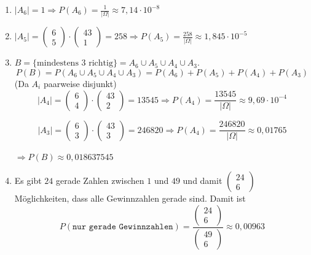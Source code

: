 \documentclass[a4paper,13pt]{scrartcl}
\begin{document}
\begin{enumerate}[label=(\alph*)]
\item $ | A_6 |  = 1 \Rightarrow P(A_6) = \frac{1}{|\Omega|}  \approx 7,14 \cdot 10^{-8}$
\item $ | A_5 |  =  \begin{pmatrix} 
    6 \\ 5 \end{pmatrix} \cdot \begin{pmatrix} 
    43   \\ 1 \end{pmatrix} = 258 \Rightarrow P(A_5) = \frac{258}{|\Omega|}   \approx 1,845 \cdot 10^{-5}$
\item $B = \{ \text{mindestens 3 richtig}\} = A_6 \cup A_5 \cup A_4 \cup A_3$.\\
$$P(B) = P (A_6 \cup A_5 \cup A_4 \cup A_3)= P(A_6) + P(A_5) + P(A_4) + P(A_3)$$
(Da $A_i$ paarweise disjunkt)\\
 $$ | A_4 |  =  \begin{pmatrix} 
    6 \\ 4 \end{pmatrix} \cdot \begin{pmatrix} 
    43   \\ 2 \end{pmatrix} = 13545 \Rightarrow P(A_4) = \frac{13545}{|\Omega|}   \approx 9,69 \cdot 10^{-4}$$
    
 $$ | A_3 |  =  \begin{pmatrix} 
    6 \\ 3 \end{pmatrix} \cdot \begin{pmatrix} 
    43   \\ 3 \end{pmatrix} = 246820 \Rightarrow P(A_4) = \frac{246820}{|\Omega|}   \approx 0,01765$$
\\$\Rightarrow P(B) \approx 0,018637545$
\item Es gibt $24$ gerade Zahlen zwischen $1$ und $49$ und damit $ \begin{pmatrix} 
    24 \\ 6 \end{pmatrix}$ Möglichkeiten, dass alle Gewinnzahlen gerade sind. Damit ist $$P(\texttt{nur gerade Gewinnzahlen}) = \frac{\begin{pmatrix} 
    24 \\ 6 \end{pmatrix}}{\begin{pmatrix} 
    49 \\ 6 \end{pmatrix}} \approx 0,00963$$
\end{enumerate}
\vspace{8mm}
\end{document}
